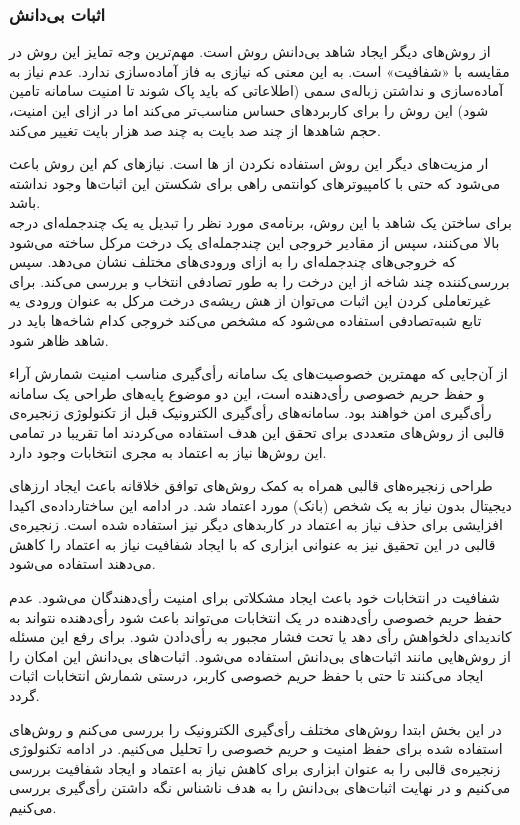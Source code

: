 \subsubsection{اثبات بی‌دانش }
از روش‌های دیگر ایجاد شاهد بی‌دانش روش 
\cite{zkstark}
است. مهم‌ترین وجه تمایز این روش در مقایسه با
 «شفافیت»
است. به این معنی که نیازی به فاز آماده‌سازی ندارد. عدم نیاز به آماده‌سازی و نداشتن زباله‌ی سمی (اطلاعاتی که باید پاک شوند تا امنیت سامانه تامین شود) این روش را برای کاربرد‌های حساس مناسب‌تر می‌کند اما در ازای این امنیت، حجم شاهد‌ها از چند صد بایت به چند صد هزار بایت تغییر می‌کند.
\par
ار مزیت‌های دیگر این روش استفاده نکردن از 
ها
است. نیاز‌های کم این روش باعث می‌شود که حتی با کامپیوتر‌های کوانتمی
 راهی برای شکستن این اثبات‌ها وجود نداشته باشد.
\\
برای ساختن یک شاهد با این روش، برنامه‌ی مورد نظر را تبدیل یه یک چندجمله‌ای درجه بالا می‌کنند، سپس از مقادیر خروجی این چندجمله‌ای یک درخت مرکل ساخته می‌شود که خروجی‌های چند‌جمله‌ای را به ازای ورودی‌های مختلف نشان می‌دهد. سپس بررسی‌کننده چند شاخه از این درخت را به طور تصادفی انتخاب و بررسی می‌کند. برای غیرتعاملی کردن این اثبات می‌توان از هش ریشه‌ی درخت مرکل به عنوان ورودی یه تابع شبه‌تصادفی
استفاده می‌شود که مشخص می‌کند خروجی کدام شاخه‌ها باید در شاهد ظاهر شود. 






از آن‌جایی که مهمترین خصوصیت‌های یک سامانه رأی‌گیری مناسب امنیت شمارش آراء و حفظ حریم خصوصی رأی‌دهنده است، این دو موضوع پایه‌های طراحی یک سامانه رأی‌گیری امن خواهند بود. سامانه‌های رأی‌گیری الکترونیک قبل از تکنولوژی زنجیره‌ی قالبی از روش‌های متعددی برای تحقق این هدف استفاده می‌کردند اما تقریبا در تمامی این روش‌ها نیاز به اعتماد به مجری انتخابات وجود دارد. 
\par
طراحی زنجیره‌های قالبی همراه به کمک روش‌های توافق خلاقانه باعث ایجاد ارز‌های دیجیتال بدون نیاز به یک شخص (بانک) مورد اعتماد شد. در ادامه این ساختارداده‌ی اکیدا افزایشی برای حذف نیاز به اعتماد در کاربدهای دیگر نیز استفاده شده است. زنجیره‌ی قالبی در این تحقیق نیز به عنوانی ابزاری که با ایجاد شفافیت نیاز به اعتماد را کاهش می‌دهند استفاده می‌شود.
\par 
شفافیت در انتخابات خود باعث ایجاد مشکلاتی برای امنیت رأی‌دهندگان می‌شود. عدم حفظ حریم خصوصی رأی‌دهنده در یک انتخابات می‌تواند باعث شود رأی‌دهنده نتواند به کاندیدای دلخواهش رأی دهد یا تحت فشار مجبور به رأی‌دادن شود. برای رفع این مسئله از روش‌هایی مانند اثبات‌های بی‌دانش استفاده می‌شود. اثبات‌های بی‌دانش این امکان را ایجاد می‌کنند تا حتی با حفظ حریم خصوصی کاربر، درستی شمارش انتخابات اثبات گردد.
\par
در این بخش ابتدا روش‌های مختلف رأی‌گیری الکترونیک را بررسی می‌کنم و روش‌های استفاده شده برای حفظ امنیت و حریم خصوصی را تحلیل می‌کنیم. در ادامه تکنولوژی زنجیره‌ی قالبی را به عنوان ابزاری برای کاهش نیاز به اعتماد و ایجاد شفافیت بررسی می‌کنیم و در نهایت اثبات‌های بی‌دانش را به هدف ناشناس نگه‌ داشتن رأی‌گیری بررسی می‌کنیم.

